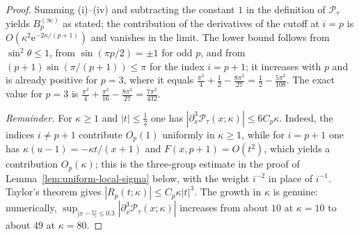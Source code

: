 \begin{proof}
Summing (i)–(iv) and subtracting the constant $1$ in the definition of $\mathcal P_\tau$ yields $B_p^{(\infty)}$ as stated; the contribution of the derivatives of the cutoff at $i=p$ is $O(\kappa^2\mathrm e^{-2\kappa/(p+1)})$ and vanishes in the limit. The lower bound follows from $\sin^2\theta\le 1$, from $\sin(\pi p/2)=\pm 1$ for odd $p$, and from $(p+1)\sin(\pi/(p+1))\le\pi$ for the index $i=p+1$; it increases with $p$ and is already positive for $p=3$, where it equals $\frac{\pi^2}{4}+\frac12-\frac{8\pi^2}{27}=\frac12-\frac{5\pi^2}{108}$. The exact value for $p=3$ is
\(
\frac{\pi^2}{4}+\frac{\pi^2}{16}-\frac{8\pi^2}{27}=\frac{7\pi^2}{432}.
\)

\emph{Remainder.} For $\kappa\ge1$ and $|t|\le\tfrac12$ one has $|\partial_x^3\mathcal P_\tau(x;\kappa)|\le 6C_p\kappa$. Indeed, the indices $i\ne p+1$ contribute $O_p(1)$ uniformly in $\kappa\ge1$, while for $i=p+1$ one has $\kappa(u-1)=-\kappa t/(x+1)$ and $F(x,p+1)=O(t^2)$, which yields a contribution $O_p(\kappa)$; this is the three-group estimate in the proof of Lemma~\ref{lem:uniform-local-sigma} below, with the weight $i^{-2}$ in place of $i^{-1}$. Taylor's theorem gives $|R_p(t;\kappa)|\le C_p\kappa|t|^3$. The growth in $\kappa$ is genuine: numerically, $\sup_{|x-5|\le0.3}|\partial_x^3\mathcal P_\tau(x;\kappa)|$ increases from about $10$ at $\kappa=10$ to about $49$ at $\kappa=80$.
\end{proof}


